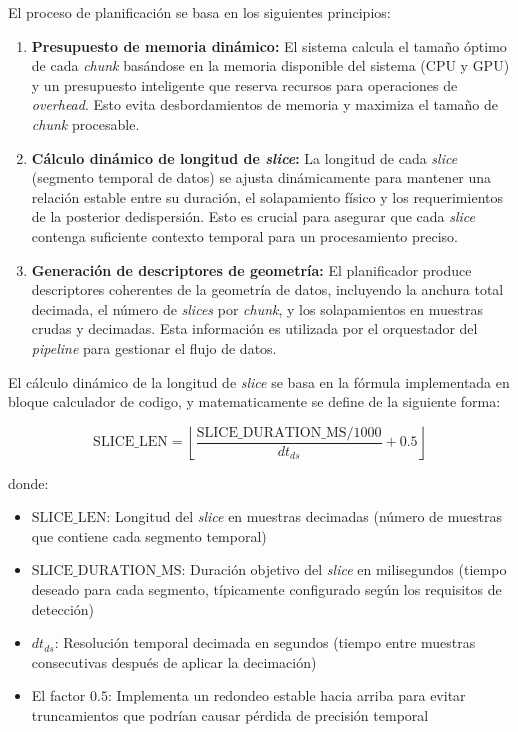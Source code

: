 El proceso de planificación se basa en los siguientes principios:
\begin{enumerate}
    \item \textbf{Presupuesto de memoria dinámico:} El sistema calcula el tamaño óptimo de cada \emph{chunk} basándose en la memoria disponible del sistema (CPU y GPU) y un presupuesto inteligente que reserva recursos para operaciones de \emph{overhead}. Esto evita desbordamientos de memoria y maximiza el tamaño de \emph{chunk} procesable.
    \item \textbf{Cálculo dinámico de longitud de \emph{slice}:} La longitud de cada \emph{slice} (segmento temporal de datos) se ajusta dinámicamente para mantener una relación estable entre su duración, el solapamiento físico y los requerimientos de la posterior dedispersión. Esto es crucial para asegurar que cada \emph{slice} contenga suficiente contexto temporal para un procesamiento preciso.
    \item \textbf{Generación de descriptores de geometría:} El planificador produce descriptores coherentes de la geometría de datos, incluyendo la anchura total decimada, el número de \emph{slices} por \emph{chunk}, y los solapamientos en muestras crudas y decimadas. Esta información es utilizada por el orquestador del \emph{pipeline} para gestionar el flujo de datos.
\end{enumerate}

El cálculo dinámico de la longitud de \emph{slice} se basa en la fórmula implementada en bloque calculador de codigo, y matematicamente se define de la siguiente forma:

\[
\text{SLICE\_LEN} = \left\lfloor \frac{\text{SLICE\_DURATION\_MS}/1000}{dt_{ds}} + 0.5 \right\rfloor
\]

donde:
\begin{itemize}
    \item $\text{SLICE\_LEN}$: Longitud del \emph{slice} en muestras decimadas (número de muestras que contiene cada segmento temporal)
    \item $\text{SLICE\_DURATION\_MS}$: Duración objetivo del \emph{slice} en milisegundos (tiempo deseado para cada segmento, típicamente configurado según los requisitos de detección)
    \item $dt_{ds}$: Resolución temporal decimada en segundos (tiempo entre muestras consecutivas después de aplicar la decimación)
    \item El factor $0.5$: Implementa un redondeo estable hacia arriba para evitar truncamientos que podrían causar pérdida de precisión temporal
\end{itemize}

